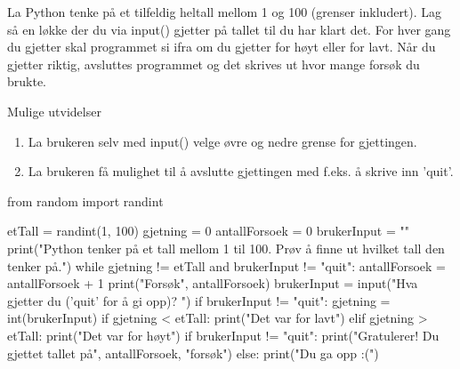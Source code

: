 \begin{exercise}
La Python tenke på et tilfeldig heltall mellom 1 og 100 (grenser inkludert). Lag så en løkke der du via input() gjetter på tallet til du har klart det. For hver gang du gjetter skal programmet si ifra om du gjetter for høyt eller for lavt. Når du gjetter riktig, avsluttes programmet og det skrives ut hvor mange forsøk du brukte. 

Mulige utvidelser
\begin{enumerate}
\item La brukeren selv med input() velge øvre og nedre grense for gjettingen.
\item La brukeren få mulighet til å avslutte gjettingen med f.eks. å skrive inn 'quit'.
\end{enumerate}
\end{exercise}
\begin{solution}
\begin{usncodebox}
from random import randint

etTall = randint(1, 100)
gjetning = 0
antallForsoek = 0
brukerInput = ""
print("Python tenker på et tall mellom 1 til 100. Prøv å finne ut hvilket tall den tenker på.")
while gjetning != etTall and brukerInput != "quit":
    antallForsoek = antallForsoek + 1
    print("Forsøk", antallForsoek)
    brukerInput = input("Hva gjetter du ('quit' for å gi opp)? ")
    if brukerInput != "quit":
        gjetning = int(brukerInput)
        if gjetning < etTall:
            print("Det var for lavt")
        elif gjetning > etTall:
            print("Det var for høyt")
if brukerInput != "quit":
    print("Gratulerer! Du gjettet tallet på", antallForsoek, "forsøk")
else:
    print("Du ga opp :(")
\end{usncodebox}
\end{solution}

